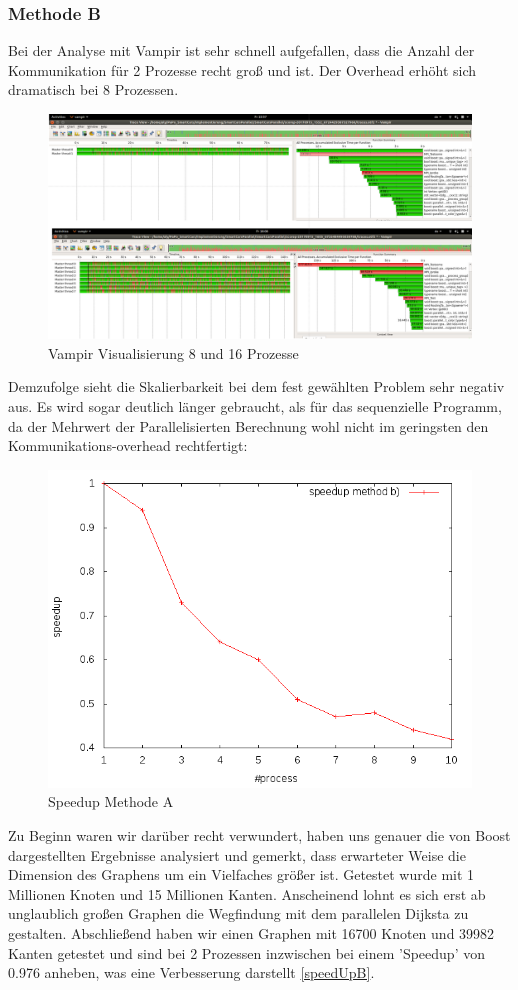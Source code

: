\documentclass[paper=A4,pagesize=auto,12pt,headinclude=true,footinclude=true,BCOR=0mm,DIV=calc]{scrartcl}
\begin{document}
	\subsubsection{Methode B}
	Bei der Analyse mit Vampir ist sehr schnell aufgefallen, dass die Anzahl der Kommunikation für 2 Prozesse recht groß und ist. Der Overhead erhöht sich dramatisch bei 8 Prozessen.
		\label{vampirB}
		\begin{figure}[H]
			\includegraphics[scale = 0.38]{Prasentation/vampirmethodB.png}
			\caption{Vampir Visualisierung 8 und 16 Prozesse}
		\end{figure}
	Demzufolge sieht die Skalierbarkeit bei dem fest gewählten Problem sehr negativ aus. Es wird sogar deutlich länger gebraucht, als für das sequenzielle Programm, da der Mehrwert der Parallelisierten Berechnung wohl nicht im geringsten den Kommunikations-overhead rechtfertigt:
	\label{speedUpB}
	\begin{figure}[H]
		\includegraphics[scale = 0.55]{Prasentation/speedupPBoost.png}
		\caption{Speedup Methode A}
	\end{figure}
	Zu Beginn waren wir darüber recht verwundert, haben uns genauer die von Boost dargestellten Ergebnisse analysiert und gemerkt, dass erwarteter Weise die Dimension des Graphens um ein Vielfaches größer ist. Getestet wurde mit 1 Millionen Knoten und 15 Millionen Kanten\cite{DijkstraBoost}. Anscheinend lohnt es sich erst ab unglaublich großen Graphen die Wegfindung mit dem parallelen Dijksta zu gestalten. Abschließend haben wir einen Graphen mit 16700 Knoten und 39982 Kanten getestet und sind bei 2 Prozessen inzwischen bei einem 'Speedup' von 0.976 anheben, was eine Verbesserung darstellt \ref{speedUpB}.
	
\end{document}
